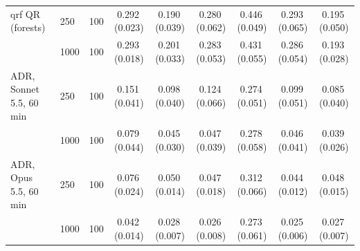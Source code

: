 \begin{tabular}{@{}llrcccccc@{}}
\midrule
qrf QR (forests) & 250 & 100 & 0.292\,{\scriptsize(0.023)} & 0.190\,{\scriptsize(0.039)} & 0.280\,{\scriptsize(0.062)} & 0.446\,{\scriptsize(0.049)} & 0.293\,{\scriptsize(0.065)} & 0.195\,{\scriptsize(0.050)} \\
 & 1000 & 100 & 0.293\,{\scriptsize(0.018)} & 0.201\,{\scriptsize(0.033)} & 0.283\,{\scriptsize(0.053)} & 0.431\,{\scriptsize(0.055)} & 0.286\,{\scriptsize(0.054)} & 0.193\,{\scriptsize(0.028)} \\
\midrule
\rowcolor{agent}ADR, Sonnet 5.5, 60 min & 250 & 100 & 0.151\,{\scriptsize(0.041)} & 0.098\,{\scriptsize(0.040)} & 0.124\,{\scriptsize(0.066)} & 0.274\,{\scriptsize(0.051)} & 0.099\,{\scriptsize(0.051)} & 0.085\,{\scriptsize(0.040)} \\
\rowcolor{agent} & 1000 & 100 & 0.079\,{\scriptsize(0.044)} & 0.045\,{\scriptsize(0.030)} & 0.047\,{\scriptsize(0.039)} & 0.278\,{\scriptsize(0.058)} & 0.046\,{\scriptsize(0.041)} & 0.039\,{\scriptsize(0.026)} \\
\midrule
\rowcolor{agent}ADR, Opus 5.5, 60 min & 250 & 100 & 0.076\,{\scriptsize(0.024)} & 0.050\,{\scriptsize(0.014)} & 0.047\,{\scriptsize(0.018)} & 0.312\,{\scriptsize(0.066)} & 0.044\,{\scriptsize(0.012)} & 0.048\,{\scriptsize(0.015)} \\
\rowcolor{agent} & 1000 & 100 & 0.042\,{\scriptsize(0.014)} & 0.028\,{\scriptsize(0.007)} & 0.026\,{\scriptsize(0.008)} & 0.273\,{\scriptsize(0.061)} & 0.025\,{\scriptsize(0.006)} & 0.027\,{\scriptsize(0.007)} \\
\bottomrule
\end{tabular}
